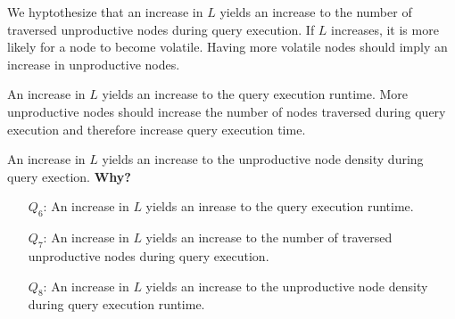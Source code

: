 \documentclass[abstracton,12pt]{scrartcl}
\theoremstyle{definition}
\begin{document}
We hyptothesize that an increase in $L$ yields an increase to the number of
traversed unproductive nodes during query execution. If $L$ increases, it is
more likely for a node to become volatile. Having more volatile nodes should
imply an increase in unproductive nodes.

An increase in $L$ yields an increase to the query execution runtime. More
unproductive nodes should increase the number of nodes traversed
during query execution and therefore increase query execution time.

An increase in $L$ yields an increase to the unproductive node density during
query exection. \textbf{Why?}

\begin{shaded}
  \begin{itemize}
  \item[$Q_6$:] An increase in $L$ yields an inrease to the query execution runtime. 
  \item[$Q_7$:] An increase in $L$ yields an increase to the number of
    traversed unproductive nodes during query execution.
  \item[$Q_8$:] An increase in $L$ yields an increase to the unproductive node
    density during query execution runtime.
  \end{itemize}
\end{shaded}
\end{document}
